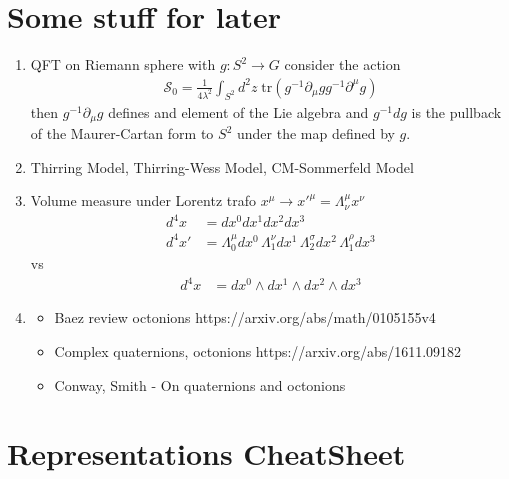 \documentclass[10pt,a4paper]{article}
\theoremstyle{definition}
\begin{document}
\section{Some stuff for later}
\begin{enumerate}
    \item QFT on Riemann sphere with $g:S^2\rightarrow G$ consider the action 
    \begin{align}
        \mathcal{S}_0=\frac{1}{4\lambda^2}\int_{S^2}d^2z\;\text{tr}(g^{-1}\partial_\mu g g^{-1}\partial^\mu g)
    \end{align}
    then $g^{-1}\partial_\mu g$ defines and element of the Lie algebra and $g^{-1}dg$ is the pullback of the Maurer-Cartan form to $S^2$ under the map defined by $g$.
    \item Thirring Model, Thirring-Wess Model, CM-Sommerfeld Model
    \item Volume measure under Lorentz trafo $x^\mu\rightarrow x'^\mu=\Lambda^\mu_\nu x^\nu$
    \begin{align}
        d^4x
        &=dx^0dx^1dx^2dx^3\\
        d^4x'&=\Lambda^\mu_0dx^0\,\Lambda^\nu_1dx^1\,\Lambda^\sigma_2dx^2\,\Lambda^\rho_1dx^3
    \end{align}
    vs
    \begin{align}
        d^4x
        &=dx^0\wedge dx^1\wedge dx^2\wedge dx^3
    \end{align}
    \item 
    \begin{itemize}
        \item Baez review octonions {\sc https://arxiv.org/abs/math/0105155v4}
        \item Complex quaternions, octonions {\sc https://arxiv.org/abs/1611.09182}
        \item Conway, Smith - On quaternions and octonions
    \end{itemize}
\end{enumerate}


\newpage
\section{Representations CheatSheet}
\end{document}
